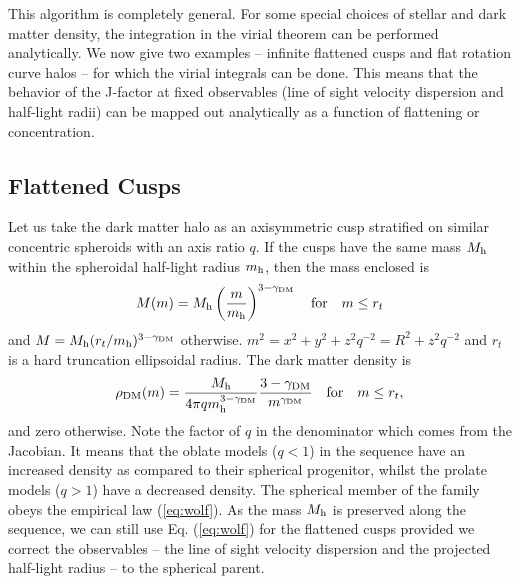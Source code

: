 \documentclass[prd,twocolumn,showpacs,preprintnumbers,superscriptaddress,nofootinbib,amsmath,amssymb,nobalancelastpage]{revtex4}
\def\mh{m_{\rm h}}
\def\Mh{M_{\rm h}}
\def\rhoDM{{\rho_{\rm DM}}}
\def\rhoDM{{\rho_{\rm DM}}}
\begin{document}
This algorithm is completely general. For some special choices of
stellar and dark matter density, the integration in the virial theorem
can be performed analytically. We now give two examples -- infinite
flattened cusps and flat rotation curve halos -- for which the virial
integrals can be done. This means that the behavior of the J-factor
at fixed observables (line of sight velocity dispersion and half-light
radii) can be mapped out analytically as a function of flattening or
concentration.

\subsection{Flattened Cusps}\label{AxiCusps}

Let us take the dark matter halo as an axisymmetric cusp
stratified on similar concentric spheroids with an axis ratio $q$. If
the cusps have the same mass $\Mh$ within the spheroidal half-light
radius $\mh$, then the mass enclosed is
%
\begin{equation}
M(m) = \Mh \left( {m\over \mh} \right)^{3-\gamma_\mathrm{DM}}\quad \mathrm{for } \quad m\leq r_t
\end{equation}
%
and $M=\Mh(r_t/\mh)^{3-\gamma_\mathrm{DM}}$ otherwise. $m^2 = x^2 + y^2 + z^2q^{-2} = R^2 + z^2q^{-2}$ and $r_t$ is a hard truncation ellipsoidal radius. The dark matter
density is
%
\begin{equation}
\rhoDM(m) = {\Mh\over 4 \pi q\mh^{3-\gamma_\mathrm{DM}}}{3 -\gamma_\mathrm{DM} \over m^{\gamma_\mathrm{DM}}}\quad \mathrm{for}\quad m\leq r_t,
\label{AxiCusp}
\end{equation}
and zero otherwise.
%
Note the factor of $q$ in the denominator which comes from the
Jacobian. It means that the oblate models ($q<1$) in the sequence have
an increased density as compared to their spherical progenitor, whilst
the prolate models ($q>1$) have a decreased density.  The spherical
member of the family obeys the empirical law (\ref{eq:wolf}).  As the
mass $\Mh$ is preserved along the sequence, we can still use
Eq.
 (\ref{eq:wolf}) for the flattened cusps provided we correct the
observables -- the line of sight velocity dispersion and the projected
half-light radius -- to the spherical parent.
\end{document}
